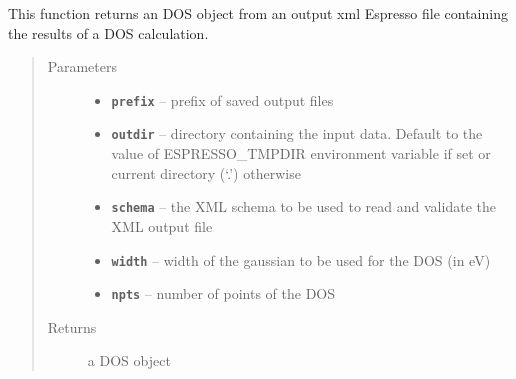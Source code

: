 \documentclass[letterpaper,10pt,english]{sphinxmanual}
\begin{document}
\begin{fulllineitems}
\label{postqe:postqe.api.get_dos}
This function returns an DOS object from an output xml Espresso file containing the
results of a DOS calculation.
\begin{quote}\begin{description}
\item[{Parameters}] \leavevmode\begin{itemize}
\item {} 
\textbf{\texttt{prefix}} -- prefix of saved output files

\item {} 
\textbf{\texttt{outdir}} -- directory containing the input data. Default to the value of     ESPRESSO\_TMPDIR environment variable if set or current directory (`.') otherwise

\item {} 
\textbf{\texttt{schema}} -- the XML schema to be used to read and validate the XML output file

\item {} 
\textbf{\texttt{width}} -- width of the gaussian to be used for the DOS (in eV)

\item {} 
\textbf{\texttt{npts}} -- number of points of the DOS

\end{itemize}

\item[{Returns}] \leavevmode
a DOS object

\end{description}\end{quote}

\end{fulllineitems}

\end{document}
